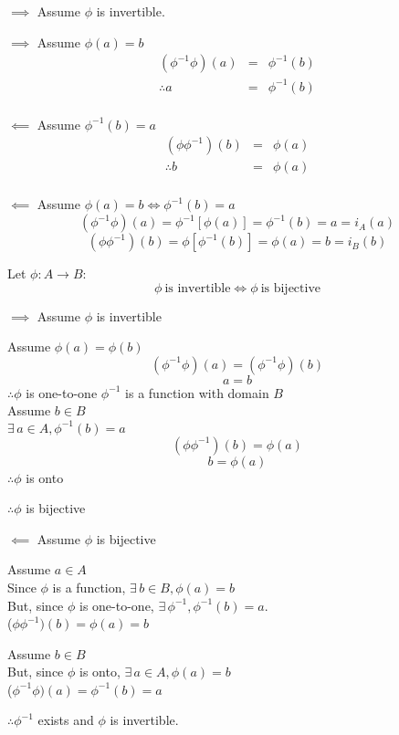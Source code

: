 \documentclass[letterpaper,12pt,fleqn]{article}
\begin{document}
\begin{theproof}
\listbreak
\begin{description}
\item $\implies$ Assume $\phi$ is invertible.
\begin{description}
\item $\implies$ Assume $\phi(a)=b$
\begin{eqnarray*}
(\phi^{-1}\phi)(a) &=& \phi^{-1}(b) \\
\therefore a &=& \phi^{-1}(b) \\
\end{eqnarray*}
\listbreak
\item $\impliedby$ Assume $\phi^{-1}(b)=a$
\begin{eqnarray*}
(\phi\phi^{-1})(b) &=& \phi(a) \\
\therefore b &=& \phi(a) \\
\end{eqnarray*}
\end{description}
\listbreak
\item $\impliedby$ Assume $\phi(a)=b\iff\phi^{-1}(b)=a$
\[(\phi^{-1}\phi)(a)=\phi^{-1}[\phi(a)]=\phi^{-1}(b)=a=i_A(a)\]
\[(\phi\phi^{-1})(b)=\phi[\phi^{-1}(b)]=\phi(a)=b=i_B(b)\]
\end{description}
\end{theproof}
\begin{theorem}
Let $\phi:A\to B$:
\[\phi\ \mbox{is invertible}\iff\phi\ \mbox{is bijective}\]
\end{theorem}
\begin{theproof}
\listbreak
\begin{description}
\item $\implies$ Assume $\phi$ is invertible

Assume $\phi(a)=\phi(b)$ \\
\[(\phi^{-1}\phi)(a)=(\phi^{-1}\phi)(b)\]
\[a=b\]
$\therefore \phi$ is one-to-one
\newpage
$\phi^{-1}$ is a function with domain $B$ \\
Assume $b\in B$ \\
$\exists\,a\in A,\phi^{-1}(b)=a$ \\
\[(\phi\phi^{-1})(b)=\phi(a)\]
\[b=\phi(a)\]
$\therefore \phi$ is onto

$\therefore \phi$ is bijective
\item $\impliedby$ Assume $\phi$ is bijective

Assume $a\in A$ \\
Since $\phi$ is a function, $\exists\,b\in B,\phi(a)=b$ \\
But, since $\phi$ is one-to-one, $\exists\,\phi^{-1},\phi^{-1}(b)=a$. \\
($\phi\phi^{-1})(b)=\phi(a)=b$

Assume $b\in B$ \\
But, since $\phi$ is onto, $\exists\,a\in A,\phi(a)=b$ \\
($\phi^{-1}\phi)(a)=\phi^{-1}(b)=a$

$\therefore \phi^{-1}$ exists and $\phi$ is invertible.
\end{description}
\end{theproof}
\end{document}
